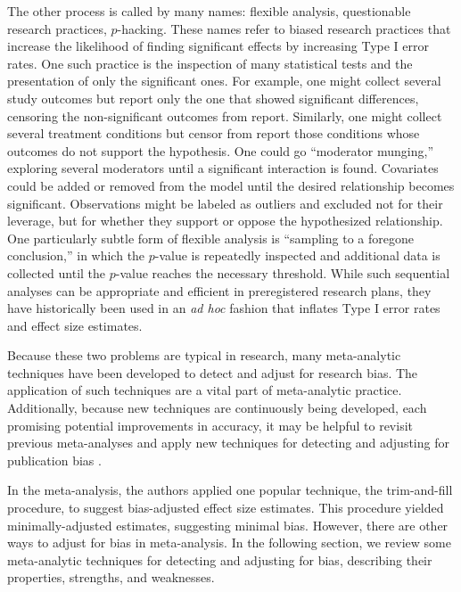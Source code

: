 \documentclass[man]{apa6}
\begin{document}
The other process is called by many names: flexible analysis, questionable research practices, $p$-hacking. These names refer to biased research practices that increase the likelihood of finding significant effects by increasing Type I error rates. One such practice is the inspection of many statistical tests and the presentation of only the significant ones. For example, one might collect several study outcomes but report only the one that showed significant differences, censoring the non-significant outcomes from report. Similarly, one might collect several treatment conditions but censor from report those conditions whose outcomes do not support the hypothesis. One could go ``moderator munging,'' exploring several moderators until a significant interaction is found. Covariates could be added or removed from the model until the desired relationship becomes significant. Observations might be labeled as outliers and excluded not for their leverage, but for whether they support or oppose the hypothesized relationship. One particularly subtle form of flexible analysis is ``sampling to a foregone conclusion,'' in which the $p$-value is repeatedly inspected and additional data is collected until the $p$-value reaches the necessary threshold. While such sequential analyses can be appropriate and efficient in preregistered research plans, they have historically been used in an {\em ad hoc} fashion that inflates Type I error rates and effect size estimates.

Because these two problems are typical in research, many meta-analytic techniques have been developed to detect and adjust for research bias. The application of such techniques are a vital part of meta-analytic practice. Additionally, because new techniques are continuously being developed, each promising potential improvements in accuracy, it may be helpful to revisit previous meta-analyses and apply new techniques for detecting and adjusting for publication bias \citep{Lakens:etal:inpress}. %

In the \citet{Anderson:etal:2010} meta-analysis, the authors applied one popular technique, the trim-and-fill procedure, to suggest bias-adjusted effect size estimates. This procedure yielded minimally-adjusted estimates, suggesting minimal bias. However, there are other ways to adjust for bias in meta-analysis. In the following section, we review some meta-analytic techniques for detecting and adjusting for bias, describing their properties, strengths, and weaknesses.
\end{document}

